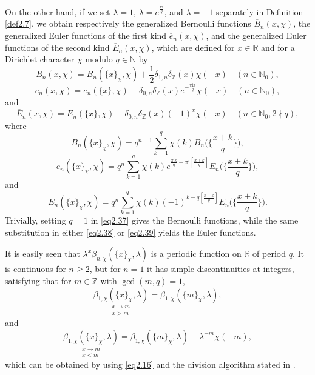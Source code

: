 \documentclass[reqno]{amsart}
\numberwithin{equation}{section}
\begin{document}
On the other hand, if we set $\lambda=1$, $\lambda=e^{\frac{\pi \mathrm{i}}{q}}$, and $\lambda=-1$ separately in Definition \ref{def2.7}, we obtain respectively the generalized Bernoulli functions $\overline{B}_{n}(x,\chi)$, the generalized Euler functions of the first kind $\overline{e}_{n}(x,\chi)$, and the generalized Euler functions of the second kind $\overline{E}_{n}(x,\chi)$, which are defined for $x\in\mathbb{R}$ and for a Dirichlet character $\chi$ modulo $q\in\mathbb{N}$ by
\begin{equation}\label{eq2.37}
\overline{B}_{n}(x,\chi)=B_{n}(\{x\}_{\chi},\chi)+\frac{1}{2}\delta_{1,n}\delta_{\mathbb{Z}}(x)\chi(-x)\quad(n\in\mathbb{N}_{0}),
\end{equation}
\begin{equation}\label{eq2.38}
\overline{e}_{n}(x,\chi)=e_{n}(\{x\},\chi)-\delta_{0,n}\delta_{\mathbb{Z}}(x)e^{-\frac{\pi \mathrm{i}x}{q}}\chi(-x)\quad(n\in\mathbb{N}_{0}),
\end{equation}
and
\begin{equation}\label{eq2.39}
\overline{E}_{n}(x,\chi)=E_{n}(\{x\},\chi)-\delta_{0,n}\delta_{\mathbb{Z}}(x)(-1)^{x}\chi(-x)\quad(n\in\mathbb{N}_{0},2\nmid q),
\end{equation}
where
\begin{equation*}
B_{n}(\{x\}_{\chi},\chi)=q^{n-1}\sum_{k=1}^{q}\chi(k)B_{n}\biggl(\biggl\{\frac{x+k}{q}\biggl\}\biggl),
\end{equation*}
\begin{equation*}
e_{n}(\{x\}_{\chi},\chi)=q^{n}\sum_{k=1}^{q}\chi(k)e^{\frac{\pi \mathrm{i}k}{q}-\pi\mathrm{i}[\frac{x+k}{q}]}E_{n}\biggl(\biggl\{\frac{x+k}{q}\biggl\}\biggl),
\end{equation*}
and
\begin{equation*}
E_{n}(\{x\}_{\chi},\chi)=q^{n}\sum_{k=1}^{q}\chi(k)(-1)^{k-q[\frac{x+k}{q}]}E_{n}\biggl(\biggl\{\frac{x+k}{q}\biggl\}\biggl).
\end{equation*}
Trivially, setting $q=1$ in \eqref{eq2.37} gives the Bernoulli functions, while the same substitution in either \eqref{eq2.38} or \eqref{eq2.39} yields the Euler functions.

It is easily seen that $\lambda^{x}\beta_{n,\chi}(\{x\}_{\chi},\lambda)$ is a periodic function on $\mathbb{R}$ of period $q$. It is continuous for
$n\geqslant2$, but for $n=1$ it has simple discontinuities at integers, satisfying that for $m\in\mathbb{Z}$ with $\gcd(m,q)=1$,
\begin{equation*}
\underset{\substack{x\rightarrow m\\ x>m}}{\beta_{1,\chi}(\{x\}_{\chi},\lambda)}=\beta_{1,\chi}(\{m\}_{\chi},\lambda),
\end{equation*}
and
\begin{equation*}
\underset{\substack{x\rightarrow m\\ x<m}}{\beta_{1,\chi}(\{x\}_{\chi},\lambda)}=\beta_{1,\chi}(\{m\}_{\chi},\lambda)+\lambda^{-m}\chi(-m),
\end{equation*}
which can be obtained by using \eqref{eq2.16} and the division algorithm stated in \cite[Theorem 1.14]{apostol4}.
\end{document}
